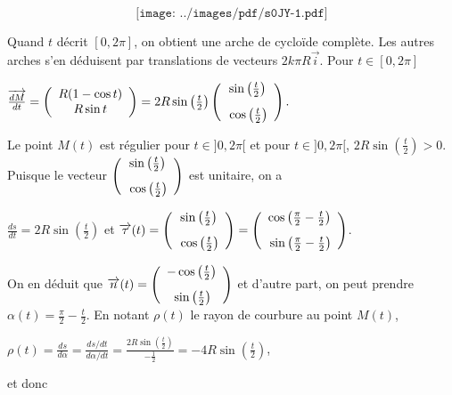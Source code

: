 {\begin{enumerate}
{$$\texttt{[image: ../images/pdf/s0JY-1.pdf]}$$

 \item  Quand $t$ décrit $[0,2\pi]$, on obtient une arche de cycloïde complète. Les autres arches s'en déduisent par translations de vecteurs $2k\pi R\overrightarrow{i}$. Pour $t\in[0,2\pi]$

\begin{center}
$\overrightarrow{\frac{dM}{dt}}=\left(
\begin{array}{c}
R(1-\cos t)\\
R\sin t
\end{array}
\right)=2R\sin\left(\frac{t}{2}\right)\left(
\begin{array}{c}
\sin\left(\frac{t}{2}\right)\\
\rule{0mm}{6mm}\cos\left(\frac{t}{2}\right)
\end{array}
\right).$
\end{center}
Le point $M(t)$ est régulier pour $t\in]0,2\pi[$ et pour $t\in]0,2\pi[$, $2R\sin\left(\frac{t}{2}\right)>0$. Puisque le vecteur $\left(
\begin{array}{c}
\sin\left(\frac{t}{2}\right)\\
\rule{0mm}{6mm}\cos\left(\frac{t}{2}\right)
\end{array}
\right)$ est unitaire, on a

\begin{center}
$\frac{ds}{dt}=2R\sin\left(\frac{t}{2}\right)$ et $\overrightarrow{\tau}(t)=\left(
\begin{array}{c}
\sin\left(\frac{t}{2}\right)\\
\rule{0mm}{6mm}\cos\left(\frac{t}{2}\right)
\end{array}
\right)=\left(
\begin{array}{c}
\cos\left(\frac{\pi}{2}-\frac{t}{2}\right)\\
\rule{0mm}{6mm}\sin\left(\frac{\pi}{2}-\frac{t}{2}\right)
\end{array}
\right)$.
\end{center}
On en déduit que $\overrightarrow{n}(t)=\left(
\begin{array}{c}
-\cos\left(\frac{t}{2}\right)\\
\rule{0mm}{6mm}\sin\left(\frac{t}{2}\right)
\end{array}
\right)$ et d'autre part, on peut prendre $\alpha(t)=\frac{\pi}{2}-\frac{t}{2}$. En notant $\rho(t)$ le rayon de courbure au point $M(t)$,

\begin{center}
$\rho(t)=\frac{ds}{d\alpha}=\frac{ds/dt}{d\alpha/dt}=\frac{2R\sin\left(\frac{t}{2}\right)}{-\frac{1}{2}}=-4R\sin\left(\frac{t}{2}\right)$,
\end{center}
et donc

}
\end{enumerate}}
